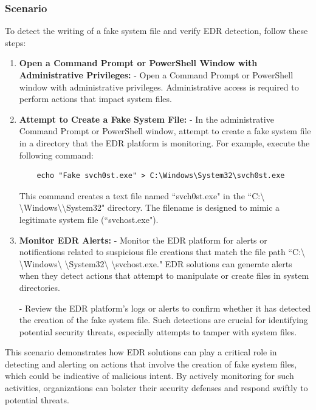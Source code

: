 \documentclass{article}
\begin{document}
\subsubsection{Scenario}

To detect the writing of a fake system file and verify EDR detection, follow these steps:

\begin{enumerate}
    \item \textbf{Open a Command Prompt or PowerShell Window with Administrative Privileges:} 
    - Open a Command Prompt or PowerShell window with administrative privileges. Administrative access is required to perform actions that impact system files.
    
    \item \textbf{Attempt to Create a Fake System File:} 
    - In the administrative Command Prompt or PowerShell window, attempt to create a fake system file in a directory that the EDR platform is monitoring. For example, execute the following command:

    \begin{verbatim}
    echo "Fake svch0st.exe" > C:\Windows\System32\svch0st.exe
    \end{verbatim}

    This command creates a text file named ``svch0st.exe" in the ``C:\textbackslash
\textbackslash Windows\textbackslash\textbackslash System32" directory. The filename is designed to mimic a legitimate system file (``svchost.exe").
    
    \item \textbf{Monitor EDR Alerts:} 
    - Monitor the EDR platform for alerts or notifications related to suspicious file creations that match the file path ``C:\textbackslash
\textbackslash Windows\textbackslash
\textbackslash System32\textbackslash
\textbackslash svchost.exe." EDR solutions can generate alerts when they detect actions that attempt to manipulate or create files in system directories.
    
    - Review the EDR platform's logs or alerts to confirm whether it has detected the creation of the fake system file. Such detections are crucial for identifying potential security threats, especially attempts to tamper with system files.
\end{enumerate}

This scenario demonstrates how EDR solutions can play a critical role in detecting and alerting on actions that involve the creation of fake system files, which could be indicative of malicious intent. By actively monitoring for such activities, organizations can bolster their security defenses and respond swiftly to potential threats.
\end{document}
